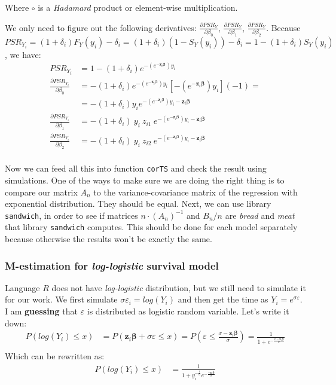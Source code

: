\documentclass[]{article}
\let\epsilon\varepsilon
\begin{document}
Where $\circ$ is a \emph{Hadamard} product or element-wise multiplication.

We only need to figure out the following derivatives: $\frac{\partial PSR_Y}{\partial \beta_0}$, $\frac{\partial PSR_Y}{\partial \beta_1}$, $\frac{\partial PSR_Y}{\partial \beta_2}$. Because $PSR_{Y_i} = (1+\delta_i)F_Y(y_i) - \delta_i = (1+\delta_i)(1 - S_Y(y_i)) - \delta_i = 1 - (1+\delta_i)S_Y(y_i)$, we have:
  $$
  \begin{aligned}
    PSR_{Y_i} &=  1 - (1+\delta_i)e^{-(e^{-\pmb{z}_i \pmb{\beta}})y_i} \\
    \frac{\partial PSR_{Y_i}}{\partial \beta_0} &= - (1+\delta_i)e^{-(e^{-\pmb{z}_i \pmb{\beta}})y_i}  \left[ -(e^{-\pmb{z}_i \pmb{\beta}})y_i \right] (-1)=\\
    &= - (1+\delta_i)y_i e^{-(e^{-\pmb{z}_i \pmb{\beta}})y_i-\pmb{z}_i \pmb{\beta}}\\
    \frac{\partial PSR_{Y_i}}{\partial \beta_1} &= - (1+\delta_i)~y_i ~z_{i1}~ e^{-(e^{-\pmb{z}_i \pmb{\beta}})y_i -\pmb{z}_i \pmb{\beta}}\\
    \frac{\partial PSR_{Y_i}}{\partial \beta_2} &= - (1+\delta_i)~y_i ~z_{i2}~ e^{-(e^{-\pmb{z}_i \pmb{\beta}})y_i -\pmb{z}_i \pmb{\beta}}\\
  \end{aligned}
  $$

Now we can feed all this into function \texttt{corTS} and check the result using simulations. One of the ways to make sure we are doing the right thing is to compare our matrix $A_n$ to the variance-covariance matrix of the regression with exponential distribution. They should be equal. Next, we can use library \texttt{sandwich}, in order to see if matrices $n\cdot(A_n)^{-1}$ and $B_n/n$ are \emph{bread} and \emph{meat} that library  \texttt{sandwich} computes. This should be done for each model separately because otherwise the results won't be exactly the same.

\subsubsection{M-estimation for \emph{log-logistic} survival model}
Language $R$ does not have \emph{log-logistic} distribution, but we still need to simulate it for our work. We first simulate $\sigma\epsilon_i = log(Y_i)$ and then get the time as $Y_i = e^{\sigma\epsilon}$. I am \textbf{guessing} that $\epsilon$ is distributed as logistic random variable. Let's write it down:
  $$
  \begin{aligned}
    P(log(Y_i) \leq x) &= P(\pmb{z}_i\pmb{\beta} + \sigma\epsilon \leq x) = P\left(\epsilon \leq \frac{ x-\pmb{z}_i\pmb{\beta} }{\sigma}\right) = \frac{  1  }{  1 + e^{-\frac{ x-\pmb{z}_i\pmb{\beta} }{\sigma}}} \\
  \end{aligned}
  $$
Which can be rewritten as:
  $$
  \begin{aligned}
    P(log(Y_i) \leq x) &= \frac{  1  }{  1 + y_i^{-\frac{1}{\sigma}} e^{-\frac{-\pmb{z}_i\pmb{\beta}}{\sigma}}   } \\
  \end{aligned}
  $$
\end{document}
